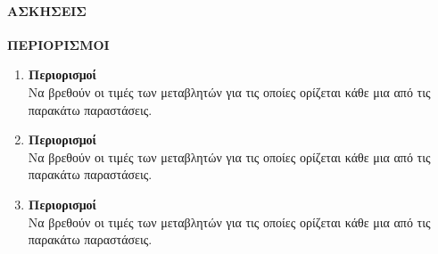 \documentclass{askhseis}
\begin{document}
\paragraph{ΑΣΚΗΣΕΙΣ}
\begin{center}
\textbf{ΠΕΡΙΟΡΙΣΜΟΙ}
\end{center}
\begin{enumerate}
\item \textbf{Περιορισμοί}\\
Να βρεθούν οι τιμές των μεταβλητών για τις οποίες ορίζεται κάθε μια από τις παρακάτω παραστάσεις.
\begin{multicols}{3}
\end{multicols}
\item \textbf{Περιορισμοί}\\
Να βρεθούν οι τιμές των μεταβλητών για τις οποίες ορίζεται κάθε μια από τις παρακάτω παραστάσεις.
\begin{multicols}{2}
\end{multicols}
\item \textbf{Περιορισμοί}\\
Να βρεθούν οι τιμές των μεταβλητών για τις οποίες ορίζεται κάθε μια από τις παρακάτω παραστάσεις.
\begin{multicols}{2}
\end{multicols}

\end{enumerate}
\end{document}
